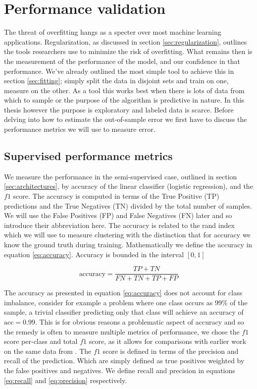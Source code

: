 \section{Performance validation}\label{sec:performance_val}

The threat of overfitting hangs as a specter over most machine learning applications. Regularization, as discussed in section \ref{sec:regularization}, outlines the tools researchers use to minimize the risk of overfitting. What remains then is the measurement of the performance of the model, and our confidence in that performance. We've already outlined the most simple tool to achieve this in section \ref{sec:fitting}; simply split the data in disjoint sets and train on one, measure on the other. As a tool this works best when there is lots of data from which to sample or the purpose of the algorithm is predictive in nature. In this thesis however the purpose is exploratory and labeled data is scarce. Before delving into how to estimate the out-of-sample error we first have to discuss the performance metrics we will use to measure error. 

\subsection{Supervised performance metrics}\label{sec:supervised_perf}

We measure the performance in the semi-supervised case, outlined in section \ref{sec:architectures}, by accuracy of the linear classifier (logistic regression), and the $f1$ score.  The accuracy is computed in terms of  the True Positive (TP) predictions and the True Negatives (TN) divided by the total number of samples. We will use the False Positives (FP) and False Negatives (FN) later and so introduce their abbreviation here. The accuracy is related to the rand index which we will use to measure clustering with the distinction that for accuracy we know the ground truth during training. Mathematically we define the accuracy in equation \ref{eq:accuracy}. Accuracy is bounded in the interval $[0, 1]$

\begin{equation}\label{eq:accuracy}
\text{accuracy} = \frac{TP + TN}{FN+ TN + TP+FP}
\end{equation}

\noindent The accuracy as presented in equation \ref{eq:accuracy} does not account for class imbalance, consider for example a problem where one class occurs as $99\%$ of the sample, a trivial classifier predicting only that class will achieve an accuracy of $\text{acc}=0.99$. This is for obvious reasons a problematic aspect of accuracy and so the remedy is often to measure multiple metrics of performance, we chose the $f1$ score per-class and total $f1$ score, as it allows for comparisons with earlier work on the same data from \citet{Kuchera2019}. The $f1$ score is defined in terms of the precision and recall of the prediction. Which are simply defined as true positives weighted by the false positives and negatives. We define recall and precision in equations \ref{eq:recall} and \ref{eq:precision} respectively.

